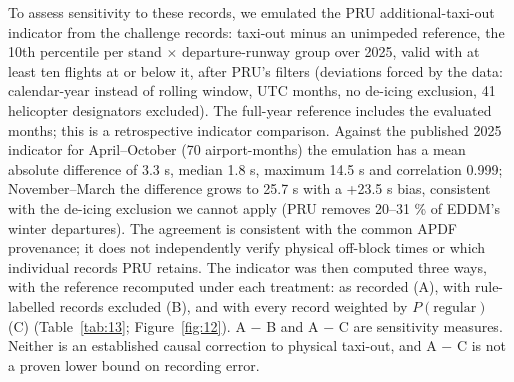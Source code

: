 \documentclass[11pt,a4paper]{article}
\begin{document}
To assess sensitivity to these records, we emulated the PRU additional-taxi-out indicator from the challenge records: taxi-out minus an unimpeded reference, the 10th percentile per stand $\times$ departure-runway group over 2025, valid with at least ten flights at or below it, after PRU's filters (deviations forced by the data: calendar-year instead of rolling window, UTC months, no de-icing exclusion, 41 helicopter designators excluded). The full-year reference includes the evaluated months; this is a retrospective indicator comparison. Against the published 2025 indicator for April--October (70 airport-months) the emulation has a mean absolute difference of 3.3 s, median 1.8 s, maximum 14.5 s and correlation 0.999; November--March the difference grows to 25.7 s with a +23.5 s bias, consistent with the de-icing exclusion we cannot apply (PRU removes 20--31 \% of EDDM's winter departures). The agreement is consistent with the common APDF provenance; it does not independently verify physical off-block times or which individual records PRU retains. The indicator was then computed three ways, with the reference recomputed under each treatment: as recorded (A), with rule-labelled records excluded (B), and with every record weighted by \(P(\text{regular})\) (C) (Table~\ref{tab:13}; Figure~\ref{fig:12}). A $-$ B and A $-$ C are sensitivity measures. Neither is an established causal correction to physical taxi-out, and A $-$ C is not a proven lower bound on recording error.
\end{document}
